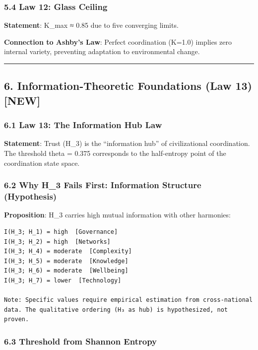\documentclass[11pt,letterpaper]{article}
\begin{document}
\subsubsection{5.4 Law 12: Glass Ceiling}\label{law-12-glass-ceiling}

\textbf{Statement}: K\_max ≈ 0.85 due to five converging limits.

\textbf{Connection to Ashby's Law}: Perfect coordination (K=1.0) implies
zero internal variety, preventing adaptation to environmental change.

\begin{center}\rule{0.5\linewidth}{0.5pt}\end{center}

\subsection{6. Information-Theoretic Foundations (Law 13)
{[}NEW{]}}\label{information-theoretic-foundations-law-13-new}

\subsubsection{6.1 Law 13: The Information Hub
Law}\label{law-13-the-information-hub-law}

\textbf{Statement}: Trust (H\_3) is the ``information hub'' of
civilizational coordination. The threshold theta = 0.375 corresponds to
the half-entropy point of the coordination state space.

\subsubsection{6.2 Why H\_3 Fails First: Information Structure
(Hypothesis)}\label{why-h_3-fails-first-information-structure-hypothesis}

\textbf{Proposition}: H\_3 carries high mutual information with other
harmonies:

\begin{verbatim}
I(H_3; H_1) = high  [Governance]
I(H_3; H_2) = high  [Networks]
I(H_3; H_4) = moderate  [Complexity]
I(H_3; H_5) = moderate  [Knowledge]
I(H_3; H_6) = moderate  [Wellbeing]
I(H_3; H_7) = lower  [Technology]

Note: Specific values require empirical estimation from cross-national
data. The qualitative ordering (H₃ as hub) is hypothesized, not proven.
\end{verbatim}

\subsubsection{6.3 Threshold from Shannon
Entropy}\label{threshold-from-shannon-entropy}
\end{document}
